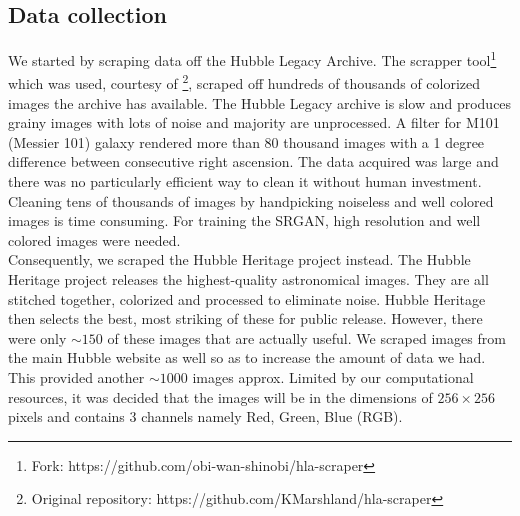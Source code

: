 \documentclass[conference]{IEEEtran}
\begin{document}
\subsection{Data collection}
\hspace*{0.25 in}We started by scraping data off the Hubble Legacy Archive. The scrapper tool\footnote{Fork: https://github.com/obi-wan-shinobi/hla-scraper} which was used, courtesy of \cite{Gao2019astronomical}\footnote{Original repository: https://github.com/KMarshland/hla-scraper}, scraped off hundreds of thousands of colorized images the archive has available. The Hubble Legacy archive is slow and produces grainy images with lots of noise and majority are unprocessed. A filter for M101 (Messier 101) galaxy rendered more than 80 thousand images with a 1 degree difference between consecutive right ascension. The data acquired was large and there was no particularly efficient way to clean it without human investment. Cleaning tens of thousands of images by handpicking noiseless and well colored images is time consuming. For training the SRGAN, high resolution and well colored images were needed.\\
\hspace*{0.25 in}Consequently, we scraped the Hubble Heritage project instead. The Hubble Heritage project releases the highest-quality astronomical images. They are all stitched together, colorized and processed to eliminate noise. Hubble Heritage then selects the best, most striking of these for public release. However, there were only $\sim150$ of these images that are actually useful. We scraped images from the main Hubble website as well so as to increase the amount of data we had. This provided another $\sim1000$ images approx. Limited by our computational resources, it was decided that the images will be in the dimensions of $256\times 256$ pixels and contains 3 channels namely Red, Green, Blue (RGB).\\
\end{document}
